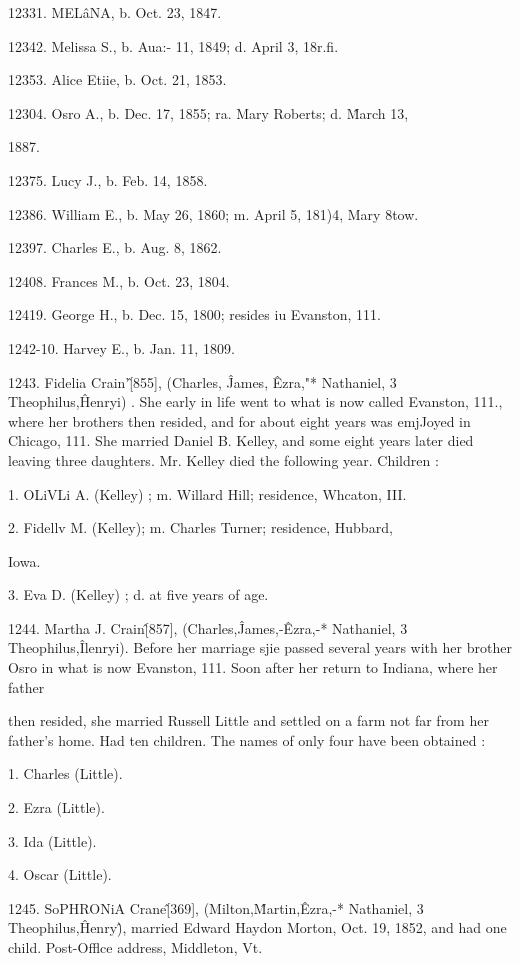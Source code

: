 \documentclass{book}
\begin{document}
12331. MEL\^aNA, b. Oct. 23, 1847. 

12342. Melissa S., b. Aua:- 11, 1849; d. April 3, 18r.fi. 

12353. Alice Etiie, b. Oct. 21, 1853. 

12304. Osro A., b. Dec. 17, 1855; ra. Mary Roberts; d. \^March 13, 

1887. 

12375. Lucy J., b. Feb. 14, 1858. 

12386. William E., b. May 26, 1860; m. April 5, 181)4, Mary 8tow. 

12397. Charles E., b. Aug. 8, 1862. 

12408. Frances M., b. Oct. 23, 1804. 

12419. George H., b. Dec. 15, 1800; resides iu Evanston, 111. 

1242-10. Harvey E., b. Jan. 11, 1809. 

1243. Fidelia Crain'\^ [855], (Charles, \^ James, \^ Ezra,"* 
Nathaniel, 3 Theophilus,\^ Henryi) . She early in life went to what 
is now called Evanston, 111., where her brothers then resided, and 
for about eight years was emjJoyed in Chicago, 111. She married 
Daniel B. Kelley, and some eight years later died leaving three 
daughters. Mr. Kelley died the following year. Children : 

1. OLiVLi A. (Kelley) ; m. Willard Hill; residence, Whcaton, III. 

2. Fidellv M. (Kelley); m. Charles Turner; residence, Hubbard, 

Iowa. 

3. Eva D. (Kelley) ; d. at five years of age. 

1244. Martha J. Crain\^ [857], (Charles,\^ James,-\^ Ezra,-* 
Nathaniel, 3 Theophilus,\^ Ilenryi). Before her marriage sjie 
passed several years with her brother Osro in what is now 
Evanston, 111. Soon after her return to Indiana, where her father 




then resided, she married Russell Little and settled on a farm not 
far from her father's home. Had ten children. The names of 
only four have been obtained : 

1. Charles (Little). 

2. Ezra (Little). 

3. Ida (Little). 

4. Oscar (Little). 

1245. SoPHRONiA Crane\^ [369], (Milton,\^ Martin,\^ Ezra,-* 
Nathaniel, 3 Theophilus,\^ Henry\^), married Edward Haydon 
Morton, Oct. 19, 1852, and had one child. Post-Offlce address, 
Middleton, Vt. 
\end{document}
